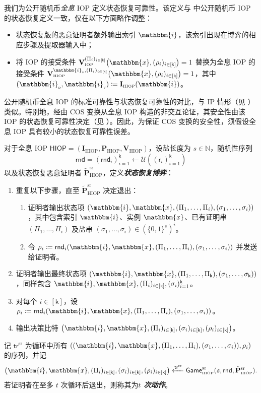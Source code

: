 \documentclass[american,singlepageview]{snargs-book-zh}
\newcommand{\defemph}[1]{\textbf{\emph{#1}}}
\newcommand{\Bits}{\{0,1\}}
\newcommand{\Malicious}[1]{\tilde{#1}}
\newcommand{\DefineEqual}{\coloneqq}
\newcommand{\Naturals}{\mathbb{N}}
\newcommand{\Index}{\mathbbm{i}}
\newcommand{\Instance}{\mathbbm{x}}
\newcommand{\ProtoIndexer}{I}
\newcommand{\ProtoProver}{P}
\newcommand{\ProtoVerifier}{V}
\newcommand{\ProtoRoundComplexity}{\mathsf{k}}
\newcommand{\ProtoRandomnessComplexity}{\mathsf{r}}
\newcommand{\RoundIndex}{i}
\newcommand{\SRSuperscript}{\mathrm{sr}}
\newcommand{\IOPSubscript}{\scriptscriptstyle\mathrm{IOP}}
\newcommand{\IOPFormat}[1]{\mathbf{#1}}
\newcommand{\IOPVerifier}{\IOPFormat{\ProtoVerifier}_{\IOPSubscript}}
\newcommand{\IOPString}{\Pi}
\newcommand{\IOPVerifierRandomMessage}{\rho}
\newcommand{\IOPRoundComplexity}{\ProtoRoundComplexity}
\newcommand{\IOPRandomnessComplexity}{\ProtoRandomnessComplexity}
\newcommand{\IOPStrings}{(\IOPString_{\RoundIndex})_{\RoundIndex \in [\IOPRoundComplexity]}}
\newcommand{\IOPVerifierRandomMessages}{(\IOPVerifierRandomMessage_{\RoundIndex})_{\RoundIndex \in [\IOPRoundComplexity]}}
\newcommand{\IOPVerifierInput}{\Instance,\IOPVerifierRandomMessages}
\newcommand{\IOPConvincingCondition}{\IOPVerifier^{\IOPStrings}\big(\IOPVerifierInput\big)}
\newcommand{\HIOPSubscript}{\scriptscriptstyle\mathrm{HIOP}}
\newcommand{\HIOPSymbol}{\mathsf{HIOP}}
\newcommand{\HIOPIndexer}{\IOPFormat{\ProtoIndexer}_{\HIOPSubscript}}
\newcommand{\HIOPProver}{\IOPFormat{\ProtoProver}_{\HIOPSubscript}}
\newcommand{\HIOPVerifier}{\IOPFormat{\ProtoVerifier}_{\HIOPSubscript}}
\newcommand{\HIOPSystem}{(\HIOPIndexer,\HIOPProver,\HIOPVerifier)}
\newcommand{\ProverEncodedIndex}{\Index_{{\scriptscriptstyle\mathrm{p}}}}
\newcommand{\VerifierEncodedIndex}{\Index_{{\scriptscriptstyle\mathrm{v}}}}
\newcommand{\HIOPMaliciousProver}{\Malicious{\IOPFormat{\ProtoProver}}_{\HIOPSubscript}}
\newcommand{\HIOPMaliciousSRProver}{\HIOPMaliciousProver^{\SRSuperscript}}
\newcommand{\HIOPStateRestorationGame}[3]{\SRGameName{\HIOPSubscript}(#1,#2,#3)}
\newcommand{\HIOPSRGameStateEntry}[1]{(\Index,\Instance,(\IOPString_{1},\dots,\IOPString_{#1}),(\SRSaltString_{1},\dots,\SRSaltString_{#1}))}
\newcommand{\HIOPSROutput}{\big(\Index,\Instance,\IOPStrings,\SRSaltStrings{\IOPRoundComplexity},\IOPVerifierRandomMessages\big)}
\newcommand{\HIOPConvincingCondition}{\HIOPVerifier^{\VerifierEncodedIndex,\IOPStrings}\big(\IOPVerifierInput\big)}
\newcommand{\RODistribution}[1]{\mathcal{U}(#1)}
\newcommand{\ROTrace}{\mathsf{tr}}
\newcommand{\SRBudget}{t}
\newcommand{\SRSaltSize}{s}
\newcommand{\SRSaltString}{\sigma}
\newcommand{\SRSaltStrings}[1]{(\SRSaltString_{\RoundIndex})_{\RoundIndex \in [#1]}}
\newcommand{\SRRandomness}{\mathsf{rnd}}
\newcommand{\SRTrace}{\ROTrace^{\SRSuperscript}}
\newcommand{\SRGameName}[1]{\mathsf{Game}_{#1}^{\SRSuperscript}}
\begin{document}
我们为公开随机币\emph{全息} IOP 定义状态恢复可靠性。该定义与  中公开随机币 IOP 的状态恢复定义一致，仅在以下方面略作调整：
\begin{itemize}[nolistsep]
  \item 状态恢复版的恶意证明者额外输出索引 $\Index$，该索引出现在博弈的相应步骤及提取器输入中；
  \item 将 IOP 的接受条件 $\IOPConvincingCondition=1$ 替换为全息 IOP 的接受条件 $\HIOPConvincingCondition=1$，其中 $(\ProverEncodedIndex,\VerifierEncodedIndex)\DefineEqual\HIOPIndexer(\Index)$。
\end{itemize}

公开随机币全息 IOP 的标准可靠性与状态恢复可靠性的对比，与 IP 情形（见 ）类似。特别地，经由 COS 变换从全息 IOP 构造的非交互论证，其安全性由该 IOP 的状态恢复可靠性决定（见 ）。因此，为保证 COS 变换的安全性，须假设全息 IOP 具有较小的状态恢复可靠性误差。

\begin{definition}
\label{definition:hiop-state-restoration-game}
对于全息 IOP $\HIOPSymbol=\HIOPSystem$，设盐长度为 $\SRSaltSize\in\Naturals$，随机性序列
\[
  \SRRandomness=(\SRRandomness_{\RoundIndex})_{\RoundIndex=1}^{\IOPRoundComplexity}
  \gets \RODistribution{(\IOPRandomnessComplexity_{\RoundIndex})_{\RoundIndex=1}^{\IOPRoundComplexity}}
\]
以及状态恢复恶意证明者 $\HIOPMaliciousSRProver$，定义\defemph{状态恢复博弈}：
\begin{enumerate}[nolistsep]
  \item 重复以下步骤，直至 $\HIOPMaliciousSRProver$ 决定退出：
  \begin{enumerate}[nolistsep]
    \item 证明者输出状态项 $\HIOPSRGameStateEntry{\RoundIndex}$，其中包含索引 $\Index$、实例 $\Instance$、已有证明串 $(\IOPString_{1},\dots,\IOPString_{\RoundIndex})$ 及盐串 $(\SRSaltString_{1},\dots,\SRSaltString_{\RoundIndex})\in(\Bits^{\SRSaltSize})^{\RoundIndex}$。
    \item 令
      \(
        \IOPVerifierRandomMessage_{\RoundIndex}
        \DefineEqual \SRRandomness_{\RoundIndex}\HIOPSRGameStateEntry{\RoundIndex}
      \)
      并发送给证明者。
  \end{enumerate}
  \item 证明者输出最终状态项 $\HIOPSRGameStateEntry{\IOPRoundComplexity}$，同样包含 $\Index,\Instance,\IOPStrings,(\SRSaltString_{\RoundIndex})_{\RoundIndex=1}^{\IOPRoundComplexity}$。
  \item 对每个 $\RoundIndex\in[\IOPRoundComplexity]$，设
    \(
      \IOPVerifierRandomMessage_{\RoundIndex}
      \DefineEqual \SRRandomness_{\RoundIndex}\HIOPSRGameStateEntry{\RoundIndex}
    \)。
  \item 输出决策比特 $\HIOPSROutput$。
\end{enumerate}
记 $\SRTrace$ 为循环中所有
\(
  (\HIOPSRGameStateEntry{\RoundIndex},\IOPVerifierRandomMessage_{\RoundIndex})
\)
的序列，并记
\[
  \HIOPSROutput \xleftarrow{\SRTrace}
    \HIOPStateRestorationGame{\SRSaltSize}{\SRRandomness}{\HIOPMaliciousSRProver}.
\]
若证明者在至多 $\SRBudget$ 次循环后退出，则称其为\defemph{$\SRBudget$ 次动作}。
\end{definition}
\end{document}

